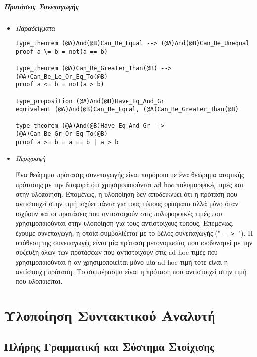 \documentclass[diploma]{softlab-thesis}
\begin{document}
\newpage

\paragraph{Προτάσεις Συνεπαγωγής}

\begin{itemize}
\item \textit{Παραδείγματα}

\begin{verbatim}
type_theorem (@A)And(@B)Can_Be_Equal --> (@A)And(@B)Can_Be_Unequal
proof a \= b = not(a == b)

type_theorem (@A)Can_Be_Greater_Than(@B) --> (@A)Can_Be_Le_Or_Eq_To(@B)
proof a <= b = not(a > b)

type_proposition (@A)And(@B)Have_Eq_And_Gr
equivalent (@A)And(@B)Can_Be_Equal, (@A)Can_Be_Greater_Than(@B)

type_theorem (@A)And(@B)Have_Eq_And_Gr --> (@A)Can_Be_Gr_Or_Eq_To(@B)
proof a >= b = a == b | a > b
\end{verbatim}

\item \textit{Περιγραφή}

Ένα θεώρημα πρότασης συνεπαγωγής είναι παρόμοιο με ένα θεώρημα ατομικής
πρότασης με την διαφορά ότι χρησιμοποιούνται ad hoc πολυμορφικές τιμές και στην
υλοποίηση. Επομένως, η υλοποίηση δεν αποδεικνύει ότι η πρόταση που αντιστοιχεί
στην τιμή ισχύει πάντα για τους τύπους ορίσματα αλλά μόνο όταν ισχύουν και οι
προτάσεις που αντιστοιχούν στις πολυμορφικές τιμές που χρησιμοποιούνται στην
υλοποίηση για τους αντίστοιχους τύπους. Επομένως, έχουμε συνεπαγωγή, η οποία
συμβολίζεται με το βέλος συνεπαγωγής ("\verb| --> |"). Η υπόθεση της
συνεπαγωγής είναι μία πρόταση μετονομασίας που ισοδυναμεί με την σύζευξη όλων
των προτάσεων που αντιστοιχούν στις ad hoc τιμές που χρησιμοποιούνται ή αν
χρησιμοποιείται μόνο μία ad hoc τιμή τότε είναι η αντίστοιχη πρόταση. Το
συμπέρασμα είναι η πρόταση που αντιστοιχεί στην τιμή που υλοποιείται.

\end{itemize}

\chapter{Υλοποίηση Συντακτικού Αναλυτή}

\section{Πλήρης Γραμματική και Σύστημα Στοίχισης}
\label{sec:indsysgr}
\end{document}

